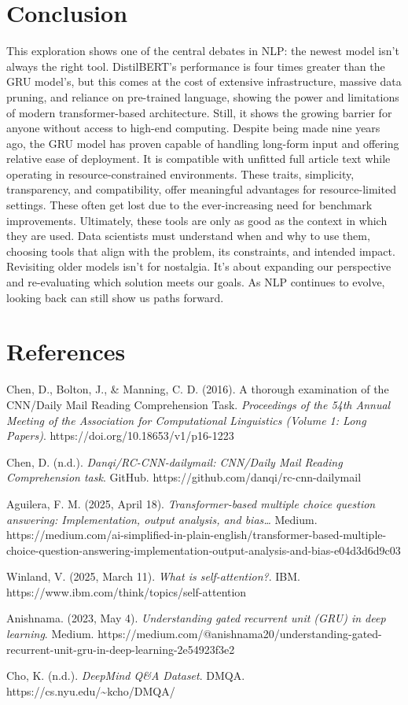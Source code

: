 \documentclass[11pt]{article}
\begin{document}
    \section{Conclusion}\label{conclusion}

    This exploration shows one of the central debates in NLP: the newest
model isn't always the right tool. DistilBERT's performance is four
times greater than the GRU model's, but this comes at the cost of
extensive infrastructure, massive data pruning, and reliance on
pre-trained language, showing the power and limitations of modern
transformer-based architecture. Still, it shows the growing barrier for
anyone without access to high-end computing. Despite being made nine
years ago, the GRU model has proven capable of handling long-form input
and offering relative ease of deployment. It is compatible with unfitted
full article text while operating in resource-constrained environments.
These traits, simplicity, transparency, and compatibility, offer
meaningful advantages for resource-limited settings. These often get
lost due to the ever-increasing need for benchmark improvements.
Ultimately, these tools are only as good as the context in which they
are used. Data scientists must understand when and why to use them,
choosing tools that align with the problem, its constraints, and
intended impact. Revisiting older models isn't for nostalgia. It's about
expanding our perspective and re-evaluating which solution meets our
goals. As NLP continues to evolve, looking back can still show us paths
forward.

\section{References}\label{references}

Chen, D., Bolton, J., \& Manning, C. D. (2016). A thorough examination
of the CNN/Daily Mail Reading Comprehension Task. \emph{Proceedings of
the 54th Annual Meeting of the Association for Computational Linguistics
(Volume 1: Long Papers)}. https://doi.org/10.18653/v1/p16-1223

Chen, D. (n.d.). \emph{Danqi/RC-CNN-dailymail: CNN/Daily Mail Reading
Comprehension task}. GitHub. https://github.com/danqi/rc-cnn-dailymail

Aguilera, F. M. (2025, April 18). \emph{Transformer-based multiple
choice question answering: Implementation, output analysis, and
bias\ldots{}} Medium.
https://medium.com/ai-simplified-in-plain-english/transformer-based-multiple-choice-question-answering-implementation-output-analysis-and-bias-e04d3d6d9c03

Winland, V. (2025, March 11). \emph{What is self-attention?}. IBM.
https://www.ibm.com/think/topics/self-attention

Anishnama. (2023, May 4). \emph{Understanding gated recurrent unit (GRU)
in deep learning}. Medium.
https://medium.com/@anishnama20/understanding-gated-recurrent-unit-gru-in-deep-learning-2e54923f3e2

Cho, K. (n.d.). \emph{DeepMind Q\&A Dataset}. DMQA.
https://cs.nyu.edu/\textasciitilde kcho/DMQA/


    
    
    
\end{document}
